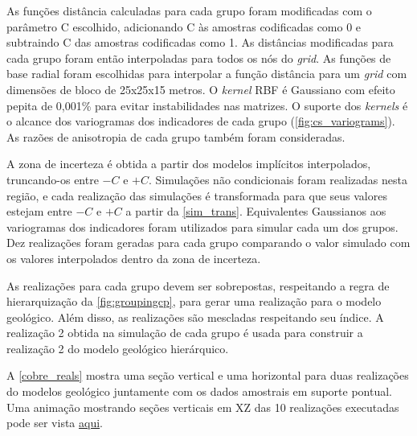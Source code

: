 As funções distância calculadas para cada grupo foram modificadas com o parâmetro C escolhido, adicionando C às amostras codificadas como 0 e subtraindo C das amostras codificadas como 1. As distâncias modificadas para cada grupo foram então interpoladas para todos os nós do \textit{grid}. As funções de base radial foram escolhidas para interpolar a função distância para um \textit{grid} com dimensões de bloco de 25x25x15 metros. O \textit{kernel} RBF é Gaussiano com efeito pepita de 0,001\% para evitar instabilidades nas matrizes. O suporte dos \textit{kernels} é o alcance dos variogramas dos indicadores de cada grupo (\autoref{fig:cs_variograms}). As razões de anisotropia de cada grupo também foram consideradas.

A zona de incerteza é obtida a partir dos modelos implícitos interpolados, truncando-os entre $-C$ e $+C$. Simulações não condicionais foram realizadas nesta região, e cada realização das simulações é transformada para que seus valores estejam entre $-C$ e $+ C$ a partir da \autoref{sim_trans}. Equivalentes Gaussianos aos variogramas dos indicadores foram utilizados para simular cada um dos grupos. Dez realizações foram geradas para cada grupo comparando o valor simulado com os valores interpolados dentro da zona de incerteza. 

As realizações para cada grupo devem ser sobrepostas, respeitando a regra de hierarquização da \autoref{fig:groupingcp}, para gerar uma realização para o modelo geológico. Além disso, as realizações são mescladas respeitando seu índice. A realização 2 obtida na simulação de cada grupo é usada para construir a realização 2 do modelo geológico hierárquico.

A \autoref{cobre_reals} mostra uma seção vertical e uma horizontal para duas realizações do modelos geológico juntamente com os dados amostrais em suporte pontual. Uma animação mostrando seções verticais em XZ das 10 realizações executadas pode ser vista \href{https://github.com/robertorolo/hierarchical_boundary_simulation/blob/main/copper_gif.gif}{aqui}.

